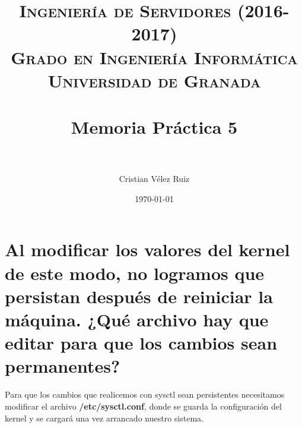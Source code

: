 


\title{	
\normalfont \normalsize 
\textsc{\textbf{Ingeniería de Servidores (2016-2017)} \\ Grado en Ingeniería Informática \\ Universidad de Granada} \\ [25pt] %
\horrule{0.5pt} \\[0.4cm] %
\huge Memoria Práctica 5 \\ %
\horrule{2pt} \\[0.5cm] %
}

\author{Cristian Vélez Ruiz} %

\date{\normalsize\today} %



\maketitle %

\newpage %

\tableofcontents %

\listoffigures

\listoftables

\newpage

\section[Cuestión 1]{Al modificar los valores del kernel de este modo, no logramos que persistan después de reiniciar la máquina. ¿Qué archivo hay que editar para que los cambios sean permanentes?}

Para que los cambios que realicemos con sysctl sean persistentes necesitamos modificar el archivo \textbf{/etc/sysctl.conf}, donde se guarda la configuración del kernel y se cargará una vez arrancado nuestro sistema.

